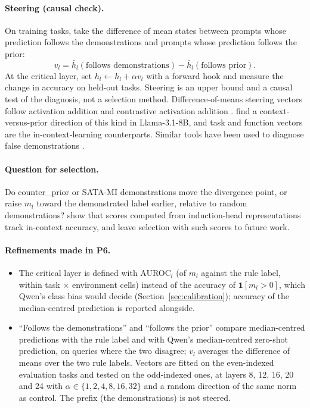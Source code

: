 \documentclass[11pt,a4paper]{article}
\newcommand{\1}{\mathbf{1}}
\theoremstyle{plain}
\theoremstyle{definition}
\theoremstyle{remark}
\begin{document}
\paragraph{Steering (causal check).} On training tasks, take the difference
of mean states between prompts whose prediction follows the demonstrations
and prompts whose prediction follows the prior:
\[
  v_l = \bar h_l(\text{follows demonstrations}) - \bar h_l(\text{follows prior}).
\]
At the critical layer, set $h_l \leftarrow h_l + \alpha v_l$ with a forward
hook and measure the change in accuracy on held-out tasks. Steering is an
upper bound and a causal test of the diagnosis, not a selection method.
Difference-of-means steering vectors follow activation addition
\citep{turner2023activation} and contrastive activation addition
\citep{rimsky2024steering}. \citet{minder2025controllable} find a
context-versus-prior direction of this kind in Llama-3.1-8B, and task and
function vectors \citep{hendel2023incontext,todd2024function} are the
in-context-learning counterparts. Similar tools have been used to diagnose
false demonstrations \citep{halawi2024overthinking}.

\paragraph{Question for selection.} Do counter\_prior or SATA-MI
demonstrations move the divergence point, or raise $m_l$ toward the
demonstrated label earlier, relative to random demonstrations?
\citet{kato2025affinity} show that scores computed from induction-head
representations track in-context accuracy, and leave selection with such
scores to future work.

\paragraph{Refinements made in P6.}
\begin{itemize}[nosep]
  \item The critical layer is defined with AUROC$_l$ (of $m_l$ against the
        rule label, within task $\times$ environment cells) instead of the
        accuracy of $\1[m_l > 0]$, which Qwen's class bias would decide
        (Section~\ref{sec:calibration}); accuracy of the median-centred
        prediction is reported alongside.
  \item ``Follows the demonstrations'' and ``follows the prior'' compare
        median-centred predictions with the rule label and with Qwen's
        median-centred zero-shot prediction, on queries where the two
        disagree; $v_l$ averages the difference of means over the two rule
        labels. Vectors are fitted on the even-indexed evaluation tasks and
        tested on the odd-indexed ones, at layers 8, 12, 16, 20 and 24 with
        $\alpha \in \{1, 2, 4, 8, 16, 32\}$ and a random direction of the same
        norm as control. The prefix (the demonstrations) is not steered.
\end{itemize}
\end{document}
